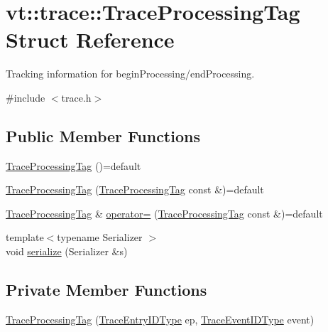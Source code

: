 \hypertarget{structvt_1_1trace_1_1_trace_processing_tag}{}\section{vt\+:\+:trace\+:\+:Trace\+Processing\+Tag Struct Reference}
\label{structvt_1_1trace_1_1_trace_processing_tag}


Tracking information for begin\+Processing/end\+Processing.  




{\ttfamily \#include $<$trace.\+h$>$}

\subsection*{Public Member Functions}
\begin{DoxyCompactItemize}
\item 
\hyperlink{structvt_1_1trace_1_1_trace_processing_tag_af06f6265d03791717242e1cec769dd84}{Trace\+Processing\+Tag} ()=default
\item 
\hyperlink{structvt_1_1trace_1_1_trace_processing_tag_a332019e755f6265ab0a74626322c590f}{Trace\+Processing\+Tag} (\hyperlink{structvt_1_1trace_1_1_trace_processing_tag}{Trace\+Processing\+Tag} const \&)=default
\item 
\hyperlink{structvt_1_1trace_1_1_trace_processing_tag}{Trace\+Processing\+Tag} \& \hyperlink{structvt_1_1trace_1_1_trace_processing_tag_a56727ddff7dce03576f3ed117235b327}{operator=} (\hyperlink{structvt_1_1trace_1_1_trace_processing_tag}{Trace\+Processing\+Tag} const \&)=default
\item 
{\footnotesize template$<$typename Serializer $>$ }\\void \hyperlink{structvt_1_1trace_1_1_trace_processing_tag_a1ba93d793a0bb501e426138804bda284}{serialize} (Serializer \&s)
\end{DoxyCompactItemize}
\subsection*{Private Member Functions}
\begin{DoxyCompactItemize}
\item 
\hyperlink{structvt_1_1trace_1_1_trace_processing_tag_af0798e165b92f31ff0b84e7f063162ea}{Trace\+Processing\+Tag} (\hyperlink{namespacevt_1_1trace_a3c14050715ba9eceaeff51fb3de64f2f}{Trace\+Entry\+I\+D\+Type} ep, \hyperlink{namespacevt_1_1trace_a64a7185f3e102df8d8258f263ccd1582}{Trace\+Event\+I\+D\+Type} event)
\end{DoxyCompactItemize}
